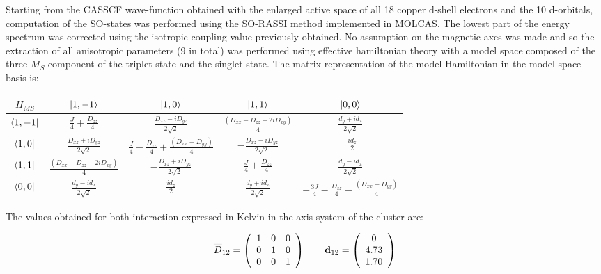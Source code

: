 \documentclass[10pt]{report}
\numberwithin{equation}{section}
\begin{document}
Starting from the CASSCF wave-function obtained with the enlarged active space of all 18 copper d-shell electrons and the 10 d-orbitals, computation of the SO-states was performed using the SO-RASSI method implemented in MOLCAS.
The lowest part of the energy spectrum was corrected using the isotropic coupling value previously obtained.
No assumption on the magnetic axes was made and so the extraction of all anisotropic parameters (9 in total) was performed using effective hamiltonian theory with a model space composed of the three $M_S$ component of the triplet state and the singlet state.
The matrix representation of the model Hamiltonian in the model space basis is:
\begin{center}
    \begin{tabular}{c | c c c c}
        $H_{MS}$ & $\ket{1,-1}$ & $\ket{1,0}$ & $\ket{1,1}$ & $\ket{0,0}$\\
        \hline
        $\bra{1,-1}$ & $\frac{J}{4}+\frac{D_{zz}}{4}$ & $\frac{D_{xz}-iD_{yz}}{2\sqrt{2}}$ & $\frac{(D_{xx}-D_{zz}-2iD_{xy})}{4} $& $\frac{d_y+id_x}{2\sqrt{2}}$\\
        $\bra{1,0}$ & $\frac{D_{xz}+iD_{yz}}{2\sqrt{2}}$ &$ \frac{J}{4} -\frac{D_{zz}}{4} +\frac{(D_{xx}+D_{yy})}{4}$& $-\frac{D_{xz}-iD_{yz}}{2\sqrt{2}}$ & -$\frac{id_z}{2}$ \\
        $\bra{1,1}$ &$\frac{(D_{xx}-D_{zz}+2iD_{xy})}{4} $ & $-\frac{D_{xz}+iD_{yz}}{2\sqrt{2}}$ & $\frac{J}{4}+\frac{D_{zz}}{4}$ & $\frac{d_y-id_x}{2\sqrt{2}}$\\
        $\bra{0,0}$ & $\frac{d_y-id_x}{2\sqrt{2}}$  & $\frac{id_z}{2}$  &$\frac{d_y+id_x}{2\sqrt{2}}$  & $-\frac{3J}{4}-\frac{D_{zz}}{4}-\frac{(D_{xx}+D_{yy})}{4}$\\
    \end{tabular}
\end{center}

The values obtained for both interaction expressed in Kelvin in the axis system of the cluster are:

\[ \overline{\overline{D}}_{12}= \left( \begin{array}{c c c}
    1 & 0 & 0\\
    0 & 1 & 0\\
    0 & 0 & 1
    \end{array} \right)
    \qquad
    \vb{d}_{12}=
    \left( \begin{array}{c}
    0  \\
    4.73  \\
    1.70
    \end{array} \right)
    \]
    
\end{document}
